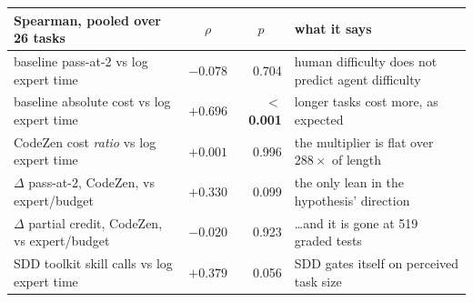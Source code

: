 
\begin{tabular}{@{}lrrl@{}}
\toprule
Spearman, pooled over 26 tasks & \multicolumn{1}{c}{$\rho$} & \multicolumn{1}{c}{$p$} & what it says \\
\midrule
baseline pass-at-2 vs log expert time & $-0.078$ & 0.704 & human difficulty does not predict agent difficulty \\
baseline absolute cost vs log expert time & $+0.696$ & \textbf{$<$0.001} & longer tasks cost more, as expected \\
CodeZen cost \emph{ratio} vs log expert time & $+0.001$ & 0.996 & the multiplier is flat over $288\times$ of length \\
$\Delta$ pass-at-2, CodeZen, vs expert/budget & $+0.330$ & 0.099 & the only lean in the hypothesis' direction \\
$\Delta$ partial credit, CodeZen, vs expert/budget & $-0.020$ & 0.923 & \dots and it is gone at 519 graded tests \\
SDD toolkit skill calls vs log expert time & $+0.379$ & 0.056 & SDD gates itself on perceived task size \\
\bottomrule
\end{tabular}
